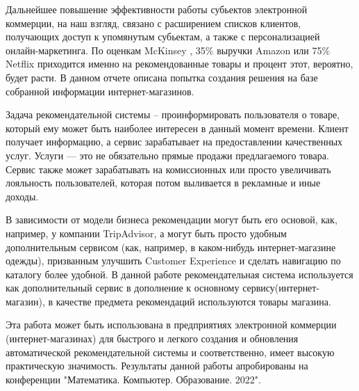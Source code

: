 \documentclass[14pt]{mmcs_article}
\begin{document}
Дальнейшее повышение эффективности работы субьектов электронной коммерции, на наш взгляд, связано с расширением списков клиентов, получающих доступ к упомянутым субьектам, а также с персонализацией онлайн-маркетинга. По оценкам McKinsey \cite{INTRO:a1}, 35\% выручки Amazon или 75\% Netflix приходится именно на рекомендованные товары и процент этот, вероятно, будет расти. В данном отчете описана попытка создания решения на базе собранной информации интернет-магазинов. 

Задача рекомендательной системы – проинформировать пользователя о товаре, который ему может быть наиболее интересен в данный момент времени. Клиент получает информацию, а сервис зарабатывает на предоставлении качественных услуг. Услуги — это не обязательно прямые продажи предлагаемого товара. Сервис также может зарабатывать на комиссионных или просто увеличивать лояльность пользователей, которая потом выливается в рекламные и иные доходы.

В зависимости от модели бизнеса рекомендации могут быть его основой, как, например, у компании TripAdvisor, а могут быть просто удобным дополнительным сервисом (как, например, в каком-нибудь интернет-магазине одежды), призванным улучшить Customer Experience и сделать навигацию по каталогу более удобной. В данной работе рекомендательная система используется как дополнительный сервис в дополнение к основному сервису(интернет-магазин), в качестве предмета рекомендаций используются товары магазина. 

Эта работа может быть использована в предприятиях электронной коммерции (интернет-магазинах) для быстрого и легкого создания и обновления автоматической рекомендательной системы и соответственно, имеет высокую практическую значимость.
Результаты данной работы апробированы на конференции "Математика. Компьютер. Образование. 2022".

\newpage
\end{document}
